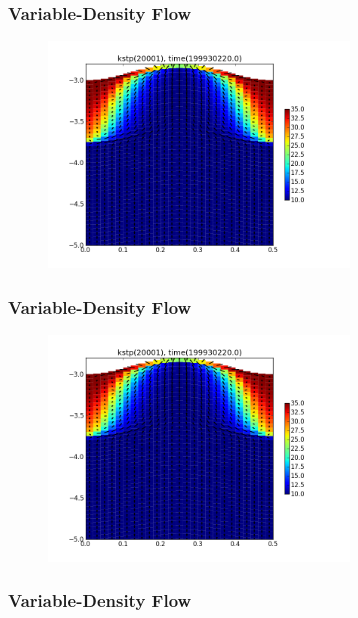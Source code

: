 \documentclass[t]{beamer}
\begin{document}
\begin{frame}[fragile]
\frametitle{Variable-Density Flow}
  \begin{figure}[ht]
  \centering
         \includegraphics[height=6cm]{figures/bedform.png}
   \end{figure}
\end{frame}

\begin{frame}[fragile]
\frametitle{Variable-Density Flow}
  \begin{figure}[ht]
  \centering
         \includegraphics[height=6cm]{figures/bedform.png}
   \end{figure}
\end{frame}


\begin{frame}[fragile]
\frametitle{Variable-Density Flow}
\begin{center}
\end{center}
\end{frame}
\end{document}
